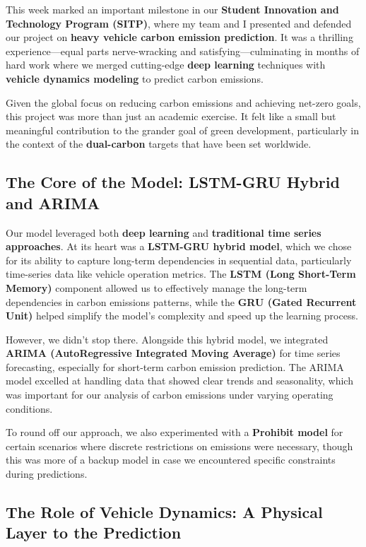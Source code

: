 \documentclass[a4paper]{article} 	%
\begin{document}
This week marked an important milestone in our \textbf{Student Innovation and Technology Program (SITP)}, where my team and I presented and defended our project on \textbf{heavy vehicle carbon emission prediction}. It was a thrilling experience—equal parts nerve-wracking and satisfying—culminating in months of hard work where we merged cutting-edge \textbf{deep learning} techniques with \textbf{vehicle dynamics modeling} to predict carbon emissions.

Given the global focus on reducing carbon emissions and achieving net-zero goals, this project was more than just an academic exercise. It felt like a small but meaningful contribution to the grander goal of green development, particularly in the context of the \textbf{dual-carbon} targets that have been set worldwide.

\subsection*{The Core of the Model: LSTM-GRU Hybrid and ARIMA}

Our model leveraged both \textbf{deep learning} and \textbf{traditional time series approaches}. At its heart was a \textbf{LSTM-GRU hybrid model}, which we chose for its ability to capture long-term dependencies in sequential data, particularly time-series data like vehicle operation metrics. The \textbf{LSTM (Long Short-Term Memory)} component allowed us to effectively manage the long-term dependencies in carbon emissions patterns, while the \textbf{GRU (Gated Recurrent Unit)} helped simplify the model’s complexity and speed up the learning process.

However, we didn’t stop there. Alongside this hybrid model, we integrated \textbf{ARIMA (AutoRegressive Integrated Moving Average)} for time series forecasting, especially for short-term carbon emission prediction. The ARIMA model excelled at handling data that showed clear trends and seasonality, which was important for our analysis of carbon emissions under varying operating conditions.

To round off our approach, we also experimented with a \textbf{Prohibit model} for certain scenarios where discrete restrictions on emissions were necessary, though this was more of a backup model in case we encountered specific constraints during predictions.

\subsection*{The Role of Vehicle Dynamics: A Physical Layer to the Prediction}
\end{document}
